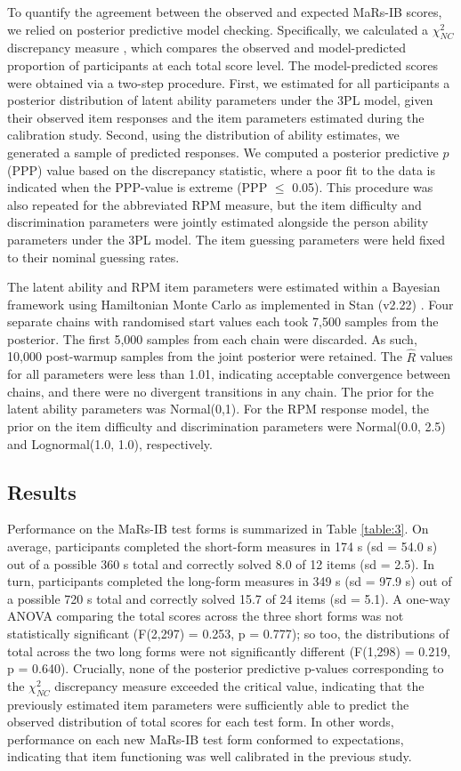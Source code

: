 \documentclass[a4paper,man,natbib]{apa6}
\begin{document}
To quantify the agreement between the observed and expected MaRs-IB scores, we relied on posterior predictive model checking. Specifically, we calculated a $\chi^2_{NC}$ discrepancy measure \citep{sinharay2006posterior}, which compares the observed and model-predicted proportion of participants at each total score level. The model-predicted scores were obtained via a two-step procedure. First, we estimated for all participants a posterior distribution of latent ability parameters under the 3PL model, given their observed item responses and the item parameters estimated during the calibration study. Second, using the distribution of ability estimates, we generated a sample of predicted responses. We computed a posterior predictive $p$ (PPP) value based on the discrepancy statistic, where a poor fit to the data is indicated when the PPP-value is extreme (PPP $\leq$ 0.05). This procedure was also repeated for the abbreviated RPM measure, but the item difficulty and discrimination parameters were jointly estimated alongside the person ability parameters under the 3PL model. The item guessing parameters were held fixed to their nominal guessing rates.

The latent ability and RPM item parameters were estimated within a Bayesian framework using Hamiltonian Monte Carlo as implemented in Stan (v2.22) \citep{carpenter2017stan}. Four separate chains with randomised start values each took 7,500 samples from the posterior. The first 5,000 samples from each chain were discarded. As such, 10,000 post-warmup samples from the joint posterior were retained. The $\hat{R}$ values for all parameters were less than 1.01, indicating acceptable convergence between chains, and there were no divergent transitions in any chain. The prior for the latent ability parameters was Normal(0,1). For the RPM response model, the prior on the item difficulty and discrimination parameters were Normal(0.0, 2.5) and Lognormal(1.0, 1.0), respectively. 

\subsection{Results}

Performance on the MaRs-IB test forms is summarized in Table \ref{table:3}. On average, participants completed the short-form measures in 174 s (sd = 54.0 s) out of a possible 360 s total and correctly solved 8.0 of 12 items (sd = 2.5). In turn, participants completed the long-form measures in 349 s (sd = 97.9 s) out of a possible 720 s total and correctly solved 15.7 of 24 items (sd = 5.1). A one-way ANOVA comparing the total scores across the three short forms was not statistically significant (F(2,297) = 0.253, p = 0.777); so too, the distributions of total across the two long forms were not significantly different (F(1,298) = 0.219, p = 0.640). Crucially, none of the posterior predictive p-values corresponding to the $\chi^2_{NC}$ discrepancy measure exceeded the critical value, indicating that the previously estimated item parameters were sufficiently able to predict the observed distribution of total scores for each test form. In other words, performance on each new MaRs-IB test form conformed to expectations, indicating that item functioning was well calibrated in the previous study.
\end{document}

